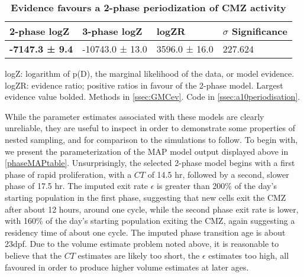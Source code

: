\begin{table}[!ht]
    \centering
    \caption{{\bf Evidence favours a 2-phase periodization of CMZ activity}}
    \begin{tabular}{|l|l|l|l|} \hline 
        {\bf 2-phase logZ} & {\bf 3-phase logZ} & {\bf logZR} & {\bf $\sigma$ Significance}\\ \hline
        \textbf{-7147.3 ± 9.4} & -10743.0 ± 13.0 & 3596.0 ± 16.0 & 227.624\\ \hline
        \end{tabular}
    \begin{flushleft} logZ: logarithm of p(D), the marginal likelihood of the data, or model evidence. logZR: evidence ratio; positive ratios in favour of the 2-phase model. Largest evidence value bolded.
    Methods in \autoref{ssec:GMCev}.
    Code in \autoref{ssec:a10periodisation}.
    \end{flushleft}
    \label{phasetable}
\end{table}

While the parameter estimates associated with these models are clearly unreliable, they are useful to inspect in order to demonstrate some properties of nested sampling, and for comparison to the simulations to follow. To begin with, we present the parameterization of the MAP model output displayed above in \autoref{phaseMAPtable}. Unsurprisingly, the selected 2-phase model begins with a first phase of rapid proliferation, with a $CT$ of 14.5 hr, followed by a second, slower phase of 17.5 hr. The imputed exit rate $\epsilon$ is greater than 200\% of the day's starting population in the first phase, suggesting that new cells exit the CMZ after about 12 hours, around one cycle, while the second phase exit rate is lower, with 160\% of the day's starting population exiting the CMZ, again suggesting a residency time of about one cycle. The imputed phase transition age is about 23dpf. Due to the volume estimate problem noted above, it is reasonable to believe that the $CT$ estimates are likely too short, the $\epsilon$ estimates too high, all favoured in order to produce higher volume estimates at later ages.

